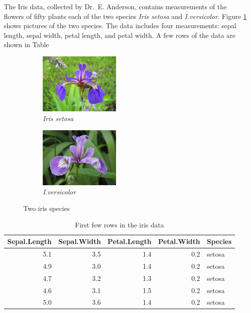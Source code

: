 \documentclass[aoas]{imsart}
\numberwithin{equation}{section}
\theoremstyle{plain}
\theoremstyle{remark}
\begin{document}
The Iris data, collected by Dr.~E. Anderson, contains measurements of
the flowers of fifty plants each of the two species \textit{Iris setosa}
and \textit{I.versicolor}. Figure \ref{fig:iris} shows pictures of the
two species. The data includes four measurements: sepal length, sepal
width, petal length, and petal width. A few rows of the data are shown
in Table

\begin{figure}
     \centering
     \begin{subfigure}[b]{0.4\textwidth}
         \centering
         \includegraphics[width=4cm]{setosa}
         \caption{\textit{Iris setosa}}
     \end{subfigure}
     \begin{subfigure}[b]{0.4\textwidth}
         \centering
         \includegraphics[width=4cm]{versicolor.jpeg}
         \caption{\textit{I.versicolor}}
     \end{subfigure}
        \caption{Two iris species}
        \label{fig:iris}
\end{figure}

\begin{table}[!h]

\caption{\label{tab:iris_data}First few rows in the iris data}
\centering
\begin{tabular}[t]{rrrrl}
\hline
Sepal.Length & Sepal.Width & Petal.Length & Petal.Width & Species\\
\hline
5.1 & 3.5 & 1.4 & 0.2 & setosa\\
4.9 & 3.0 & 1.4 & 0.2 & setosa\\
4.7 & 3.2 & 1.3 & 0.2 & setosa\\
4.6 & 3.1 & 1.5 & 0.2 & setosa\\
5.0 & 3.6 & 1.4 & 0.2 & setosa\\
\hline
\end{tabular}
\end{table}
\end{document}
